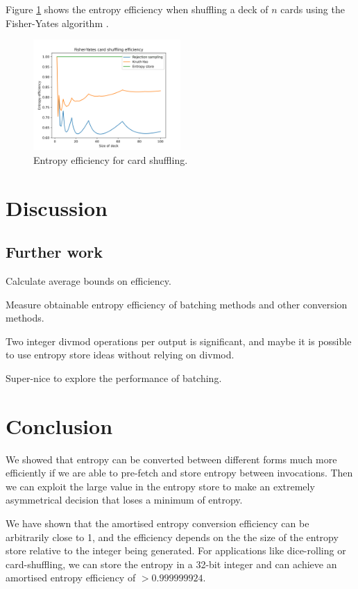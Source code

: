 \documentclass[12pt]{article}
\begin{document}
Figure \ref{fig:shuffle} shows the entropy efficiency when shuffling a deck of $n$ cards using the Fisher-Yates algorithm \cite{fisher-yates}.

\begin{figure}[ht]
\centering
\includegraphics[width=0.5\textwidth]{shuffling_efficiency.png}
\caption{Entropy efficiency for card shuffling.}
\label{fig:shuffle}
\end{figure}






\section{Discussion}


\subsection{Further work}

Calculate average bounds on efficiency.

Measure obtainable entropy efficiency of batching methods and other conversion methods.

Two integer divmod operations per output is significant, and maybe it is possible to use entropy store ideas without relying on divmod.

Super-nice to explore the performance of batching.

\section{Conclusion}

We showed that entropy can be converted between different forms much more efficiently if we are able to pre-fetch and store entropy between invocations. Then we can exploit the large value in the entropy store to make an extremely asymmetrical decision that loses a minimum of entropy.

We have shown that the amortised entropy conversion efficiency can be arbitrarily close to 1, and the efficiency depends on the the size of the entropy store relative to the integer being generated. For applications like dice-rolling or card-shuffling, we can store the entropy in a 32-bit integer and can achieve an amortised entropy efficiency of $> 0.999999924$.
\end{document}
